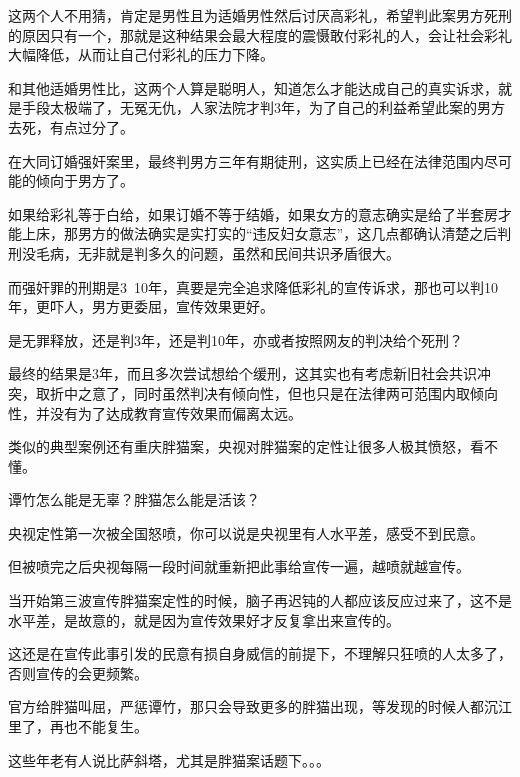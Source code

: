 \documentclass[UTF8,11pt,oneside]{ctexart}
\begin{document}
这两个人不用猜，肯定是男性且为适婚男性然后讨厌高彩礼，希望判此案男方死刑的原因只有一个，那就是这种结果会最大程度的震慑敢付彩礼的人，会让社会彩礼大幅降低，从而让自己付彩礼的压力下降。

和其他适婚男性比，这两个人算是聪明人，知道怎么才能达成自己的真实诉求，就是手段太极端了，无冤无仇，人家法院才判3年，为了自己的利益希望此案的男方去死，有点过分了。

在大同订婚强奸案里，最终判男方三年有期徒刑，这实质上已经在法律范围内尽可能的倾向于男方了。

如果给彩礼等于白给，如果订婚不等于结婚，如果女方的意志确实是给了半套房才能上床，那男方的做法确实是实打实的“违反妇女意志”，这几点都确认清楚之后判刑没毛病，无非就是判多久的问题，虽然和民间共识矛盾很大。

而强奸罪的刑期是3~10年，真要是完全追求降低彩礼的宣传诉求，那也可以判10年，更吓人，男方更委屈，宣传效果更好。


是无罪释放，还是判3年，还是判10年，亦或者按照网友的判决给个死刑？

最终的结果是3年，而且多次尝试想给个缓刑，这其实也有考虑新旧社会共识冲突，取折中之意了，同时虽然判决有倾向性，但也只是在法律两可范围内取倾向性，并没有为了达成教育宣传效果而偏离太远。

类似的典型案例还有重庆胖猫案，央视对胖猫案的定性让很多人极其愤怒，看不懂。

谭竹怎么能是无辜？胖猫怎么能是活该？

央视定性第一次被全国怒喷，你可以说是央视里有人水平差，感受不到民意。

但被喷完之后央视每隔一段时间就重新把此事给宣传一遍，越喷就越宣传。

当开始第三波宣传胖猫案定性的时候，脑子再迟钝的人都应该反应过来了，这不是水平差，是故意的，就是因为宣传效果好才反复拿出来宣传的。

这还是在宣传此事引发的民意有损自身威信的前提下，不理解只狂喷的人太多了，否则宣传的会更频繁。



官方给胖猫叫屈，严惩谭竹，那只会导致更多的胖猫出现，等发现的时候人都沉江里了，再也不能复生。

这些年老有人说比萨斜塔，尤其是胖猫案话题下。。。
\end{document}
